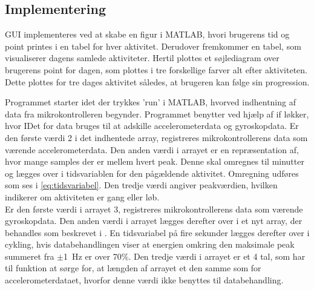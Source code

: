 \subsection{Implementering}
GUI implementeres ved at skabe en figur i MATLAB, hvori brugerens tid og point printes i en tabel for hver aktivitet. Derudover fremkommer en tabel, som visualiserer dagens samlede aktiviteter. Hertil plottes et søjlediagram over brugerens point for dagen, som plottes i tre forskellige farver alt efter aktiviteten. Dette plottes for tre dages aktivitet således, at brugeren kan følge sin progression. 

Programmet starter idet der trykkes 'run' i MATLAB, hvorved indhentning af data fra mikrokontrolleren begynder. Programmet benytter ved hjælp af if løkker, hvor IDet for data bruges til at adskille accelerometerdata og gyroskopdata. Er den første værdi 2 i det indhentede array, registreres mikrokontrollerens data som værende accelerometerdata. Den anden værdi i arrayet er en repræsentation af, hvor mange samples der er mellem hvert peak. Denne skal omregnes til minutter og lægges over i tidsvariablen for den pågældende aktivitet. Omregning udføres som ses i \eqref{eq:tidsvariabel}. Den tredje værdi angiver peakværdien, hvilken indikerer om aktiviteten er gang eller løb. \\
Er den første værdi i arrayet 3, registreres mikrokontrollerens data som værende gyroskopdata. Den anden værdi i arrayet lægges derefter over i et nyt array, der behandles som beskrevet i . En tidsvariabel på fire sekunder lægges derefter over i cykling, hvis databehandlingen viser at energien omkring den maksimale peak summeret fra $\pm$1~Hz er over 70\%. Den tredje værdi i arrayet er et 4 tal, som har til funktion at sørge for, at længden af arrayet et den samme som for accelerometerdataet, hvorfor denne værdi ikke benyttes til databehandling.   
